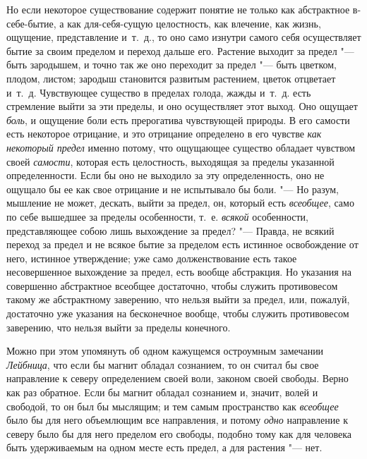Но если некоторое существование содержит понятие не только как абстрактное
в-себе-бытие, а как для-себя-сущую целостность, как влечение, как жизнь,
ощущение, представление и~т.~д., то оно само изнутри самого себя
осуществляет бытие за своим пределом и переход дальше его. Растение выходит
за предел "--- быть зародышем, и точно так же оно переходит за предел "--- быть
цветком, плодом, листом; зародыш становится развитым растением, цветок
отцветает и~т.~д. Чувствующее существо в пределах голода, жажды и~т.~д.
есть стремление выйти за эти пределы, и оно осуществляет этот выход. Оно
ощущает {\em боль}, и ощущение боли есть прерогатива
чувствующей природы. В его самости есть некоторое отрицание, и это
отрицание определено в его чувстве {\em как некоторый
предел} именно потому, что ощущающее существо обладает чувством своей
{\em самости}, которая есть целостность, выходящая за
пределы указанной определенности. Если бы оно не выходило за эту
определенность, оно не ощущало бы ее как свое отрицание и не испытывало бы
боли. "--- Но разум, мышление не может, дескать, выйти за предел, он, который
есть {\em всеобщее}, само по себе вышедшее за пределы
особенности, т.~е. {\em всякой} особенности,
представляющее собою лишь выхождение за предел? "--- Правда, не всякий переход
за предел и не всякое бытие за пределом есть истинное освобождение от него,
истинное утверждение; уже само долженствование есть такое несовершенное
выхождение за предел, есть вообще абстракция. Но указания на совершенно
абстрактное всеобщее достаточно, чтобы служить противовесом такому же
абстрактному заверению, что нельзя выйти за предел, или, пожалуй,
достаточно уже указания на бесконечное вообще, чтобы служить противовесом
заверению, что нельзя выйти за пределы конечного.

Можно при этом упомянуть об одном кажущемся остроумным замечании
{\em Лейбница}, что если бы магнит обладал сознанием,
то он считал бы свое направление к северу определением своей воли, законом
своей свободы\label{magpage}. Верно как раз
обратное. Если бы магнит обладал сознанием и, значит, волей и свободой, то
он был бы мыслящим; и тем самым пространство как
{\em всеобщее} было бы для него объемлющим все
направления, и потому {\em одно} направление к северу
было бы для него пределом его свободы, подобно тому как для человека быть
удерживаемым на одном месте есть предел, а для растения "--- нет.

